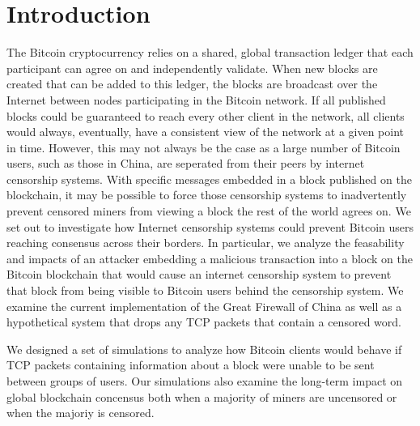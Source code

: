 \section{Introduction}
The Bitcoin cryptocurrency relies on a shared, global transaction ledger that each participant can agree on and independently validate. 
When new blocks are created that can be added to this ledger, the blocks are broadcast over the Internet between nodes participating in the Bitcoin network. 
If all published blocks could be guaranteed to reach every other client in the network, all clients would always, eventually, have a consistent view of the network at a given point in time. 
However, this may not always be the case as a large number of Bitcoin users, such as those in China, are seperated from their peers by internet censorship systems. 
With specific messages embedded in a block published on the blockchain, it may be possible to force those censorship systems to inadvertently prevent censored miners from viewing a block the rest of the world agrees on.
We set out to investigate how Internet censorship systems could prevent Bitcoin users reaching consensus across their borders.
In particular, we analyze the feasability and impacts of an attacker embedding a malicious transaction into a block on the Bitcoin blockchain that would cause an internet censorship system to prevent that block from being visible to Bitcoin users behind the censorship system.
We examine the current implementation of the Great Firewall of China as well as a hypothetical system that drops any TCP packets that contain a censored word.

We designed a set of simulations to analyze how Bitcoin clients would behave if TCP packets containing information about a block were unable to be sent between groups of users.
Our simulations also examine the long-term impact on global blockchain concensus both when a majority of miners are uncensored or when the majoriy is censored.

